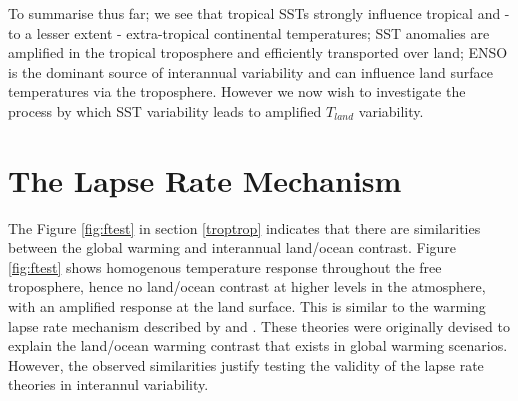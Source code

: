 To summarise thus far; we see that tropical SSTs strongly influence tropical and 
- to a lesser extent - extra-tropical continental temperatures; SST anomalies 
are amplified in the tropical troposphere and efficiently transported over land; 
ENSO is the dominant source of interannual variability and can influence land 
surface temperatures via the troposphere. However we now wish to investigate the 
process by which SST variability leads to amplified $T_{land}$ variability.  



\clearpage

\section{The Lapse Rate Mechanism}

The Figure \ref{fig:ftest} in section \ref{troptrop} indicates that there are 
similarities between the global warming and interannual land/ocean contrast.  
Figure \ref{fig:ftest}  shows homogenous temperature response throughout the 
free troposphere, hence no land/ocean contrast at higher levels in the 
atmosphere, with an amplified response at the land surface.  This is similar to 
the warming lapse rate mechanism described by \citet{Joshi2007} and 
\citet{Byrne2013a}.  These theories were originally devised to explain the 
land/ocean warming contrast that exists in global warming scenarios.  However, 
the observed similarities justify testing the validity of the lapse rate 
theories in interannul variability.

